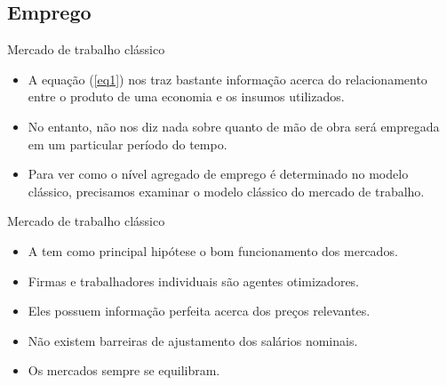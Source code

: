 \documentclass[10pt]{beamer}
\begin{document}
\subsection{Emprego}
\begin{frame}{Mercado de trabalho clássico}
    \begin{itemize}
        \item A equação (\ref{eq1}) nos traz bastante informação acerca do relacionamento entre o produto de uma economia e os insumos utilizados.\bigskip

        \item No entanto, não nos diz nada sobre quanto de mão de obra será empregada em um particular período do tempo.\bigskip

        \item Para ver como o nível agregado de emprego é determinado no modelo clássico, precisamos examinar o modelo clássico do mercado de trabalho.
    \end{itemize}
\end{frame}

\begin{frame}{Mercado de trabalho clássico}
    \begin{itemize}
        \item A  tem como principal hipótese o bom funcionamento dos mercados.\bigskip

        \item Firmas e trabalhadores individuais são agentes otimizadores.\bigskip

        \item Eles possuem informação perfeita acerca dos preços relevantes.\bigskip

        \item Não existem barreiras de ajustamento dos salários nominais.\bigskip

        \item Os mercados sempre se equilibram.
    \end{itemize}
\end{frame}
\end{document}
